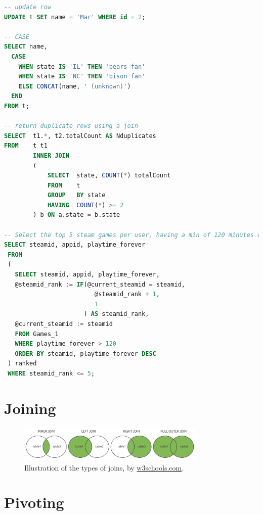 \begin{lstlisting}[language=SQL]
-- update row
UPDATE t SET name = 'Mar' WHERE id = 2;

-- CASE
SELECT name,
  CASE
    WHEN state IS 'IL' THEN 'bears fan'
    WHEN state IS 'NC' THEN 'bison fan'
    ELSE CONCAT(name, ' (unknown)')
  END
FROM t;

-- return duplicate rows using a join
SELECT  t1.*, t2.totalCount AS Nduplicates
FROM    t t1
        INNER JOIN
        (
            SELECT  state, COUNT(*) totalCount
            FROM    t
            GROUP   BY state
            HAVING  COUNT(*) >= 2
        ) b ON a.state = b.state

-- Select the top 5 steam games per user, having a min of 120 minutes of playtime
SELECT steamid, appid, playtime_forever
 FROM
 (
   SELECT steamid, appid, playtime_forever,
   @steamid_rank := IF(@current_steamid = steamid,
                         @steamid_rank + 1,
                         1
                      ) AS steamid_rank,
   @current_steamid := steamid
   FROM Games_1
   WHERE playtime_forever > 120
   ORDER BY steamid, playtime_forever DESC
 ) ranked
 WHERE steamid_rank <= 5;
\end{lstlisting}


\section{Joining}
\label{sql:join}

\begin{figure}[H]
\centering
\includegraphics[width=0.8\textwidth]{figures/sql/joins.png}
\caption{
Illustration of the types of joins, by \href{https://www.w3schools.com/sql/sql_join.asp}{w3schools.com}.
}
\label{fig:sql:joins}
\end{figure}

\section{Pivoting}
\label{sql:pivoting}

